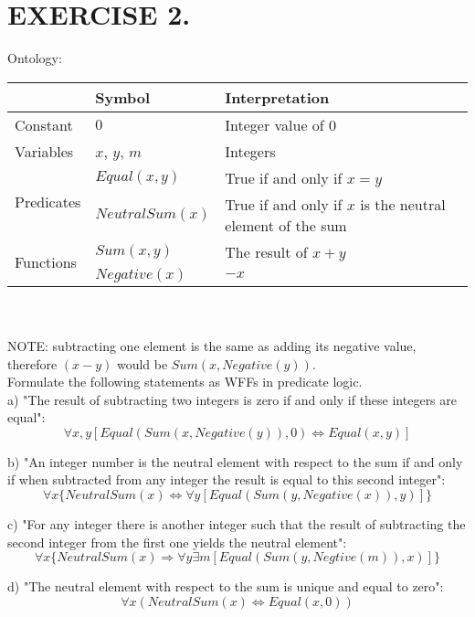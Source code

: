 \documentclass{article}
\begin{document}
\section*{EXERCISE 2.}
Ontology: \\
\begin{tabular}{|l|l|l|}
\hline
                            & Symbol                & Interpretation                      \\ \hline
Constant                    & $0$                     & Integer value of 0                  \\ \hline
Variables                   & $x$, $y$, $m$ & Integers                            \\ \hline
\multirow{2}{*}{Predicates} & $Equal(x,y)$            & True if and only if $x=y$            \\ \cline{2-3} 
                            & $NeutralSum(x)$         & True if and only if $x$ is the neutral element of the sum \\ \hline
\multirow{2}{*}{Functions}  & $Sum(x,y)$              & The result of $x+y$                   \\ \cline{2-3} 
                            & $Negative(x)$           & $-x$                                  \\ \hline
\end{tabular}\\ \\[\baselineskip]
NOTE: subtracting one element is  the same as adding its negative value, therefore $(x-y)$ would be $Sum(x,Negative(y)).$
\\[\baselineskip]
Formulate the following statements as WFFs in predicate logic.\\

a) "The result of subtracting two integers is zero if and only if these integers are equal":
$$\forall x,y [Equal(Sum(x,Negative(y)),0)\iff Equal(x,y)]$$

b) "An integer number is the neutral element with respect to the sum if and only if when subtracted from any integer the result is equal to this second
integer":
$$\forall x\{NeutralSum(x)\iff \forall y[Equal(Sum(y,Negative(x)),y)]\}$$

c) "For any integer there is another integer such that the result of subtracting
the second integer from the first one yields the neutral element":
$$\forall x\{NeutralSum(x) \Longrightarrow \forall y\exists m [Equal(Sum(y,Negtive(m)),x)]\}$$

d) "The neutral element with respect to the sum is unique and equal to zero":
$$\forall x (NeutralSum(x) \iff Equal (x,0))$$\\[\baselineskip]\\[\baselinskip]\\[\baselinskip]\\[\baselinskip]\\[\baselinskip]\\[\baselinskip]\\[\baselinskip]
\end{document}
